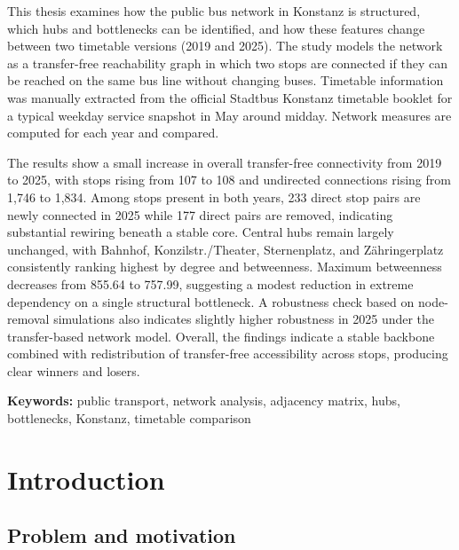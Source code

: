 \documentclass[12pt,a4paper,oneside]{report}
\begin{document}
This thesis examines how the public bus network in Konstanz is structured, which hubs and bottlenecks can be identified, and how these features change between two timetable versions (2019 and 2025).
The study models the network as a transfer-free reachability graph in which two stops are connected if they can be reached on the same bus line without changing buses.
Timetable information was manually extracted from the official Stadtbus Konstanz timetable booklet for a typical weekday service snapshot in May around midday.
Network measures are computed for each year and compared.

The results show a small increase in overall transfer-free connectivity from 2019 to 2025, with stops rising from 107 to 108 and undirected connections rising from 1,746 to 1,834.
Among stops present in both years, 233 direct stop pairs are newly connected in 2025 while 177 direct pairs are removed, indicating substantial rewiring beneath a stable core.
Central hubs remain largely unchanged, with Bahnhof, Konzilstr./Theater, Sternenplatz, and Z\"{a}hringerplatz consistently ranking highest by degree and betweenness.
Maximum betweenness decreases from 855.64 to 757.99, suggesting a modest reduction in extreme dependency on a single structural bottleneck.
A robustness check based on node-removal simulations also indicates slightly higher robustness in 2025 under the transfer-based network model.
Overall, the findings indicate a stable backbone combined with redistribution of transfer-free accessibility across stops, producing clear winners and losers.

\medskip
\noindent\textbf{Keywords:} public transport, network analysis, adjacency matrix, hubs, bottlenecks, Konstanz, timetable comparison

\tableofcontents
\clearpage
{}

\chapter{Introduction}\label{ch:introduction}

\section{Problem and motivation}\label{sec:problem}
\end{document}
